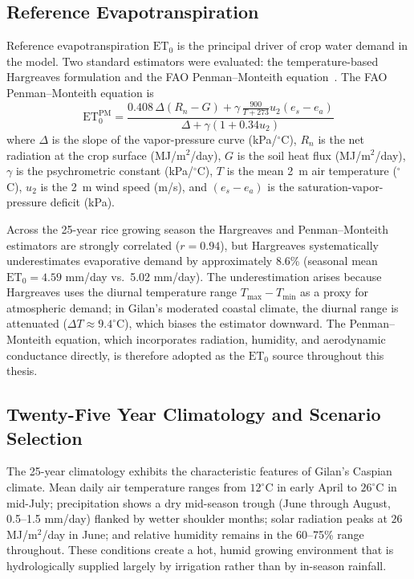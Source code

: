 \subsection{Reference Evapotranspiration}
\label{ssec:sys-et0}

Reference evapotranspiration $\mathrm{ET}_0$ is the principal driver of
crop water demand in the model. Two standard estimators were evaluated:
the temperature-based Hargreaves formulation and the FAO Penman--Monteith
equation~\cite{allen1998}. The FAO Penman--Monteith equation is
\begin{equation}
\mathrm{ET}_0^{\mathrm{PM}} = \frac{
0.408 \, \Delta (R_n - G) +
\gamma \, \frac{900}{T+273} u_2 (e_s - e_a)
}{
\Delta + \gamma (1 + 0.34 u_2)
}
\label{eq:penman-monteith}
\end{equation}
where $\Delta$ is the slope of the vapor-pressure curve (kPa/$^{\circ}$C),
$R_n$ is the net radiation at the crop surface (MJ/m$^2$/day), $G$ is the
soil heat flux (MJ/m$^2$/day), $\gamma$ is the psychrometric constant
(kPa/$^{\circ}$C), $T$ is the mean 2~m air temperature ($^{\circ}$C),
$u_2$ is the 2~m wind speed (m/s), and $(e_s - e_a)$ is the
saturation-vapor-pressure deficit (kPa).

Across the 25-year rice growing season the Hargreaves and Penman--Monteith
estimators are strongly correlated ($r = 0.94$), but Hargreaves
systematically underestimates evaporative demand by approximately 8.6\%
(seasonal mean $\mathrm{ET}_0 = 4.59$ mm/day vs.\ 5.02 mm/day). The
underestimation arises because Hargreaves uses the diurnal temperature
range $T_{\max} - T_{\min}$ as a proxy for atmospheric demand; in Gilan's
moderated coastal climate, the diurnal range is attenuated
($\Delta T \approx 9.4^{\circ}$C), which biases the estimator downward.
The Penman--Monteith equation, which incorporates radiation, humidity,
and aerodynamic conductance directly, is therefore adopted as the
$\mathrm{ET}_0$ source throughout this thesis.

\subsection{Twenty-Five Year Climatology and Scenario Selection}
\label{ssec:sys-scenarios}

The 25-year climatology exhibits the characteristic features of Gilan's
Caspian climate. Mean daily air temperature ranges from $12^{\circ}$C in
early April to $26^{\circ}$C in mid-July; precipitation shows a dry
mid-season trough (June through August, 0.5--1.5 mm/day) flanked by
wetter shoulder months; solar radiation peaks at $26$ MJ/m$^2$/day in
June; and relative humidity remains in the 60--75\% range throughout.
These conditions create a hot, humid growing environment that is
hydrologically supplied largely by irrigation rather than by in-season
rainfall.


